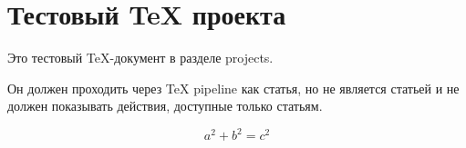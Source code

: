 \section{Тестовый TeX проекта}

Это тестовый TeX-документ в разделе projects.

Он должен проходить через TeX pipeline как статья, но не является статьей и не должен показывать действия, доступные только статьям.

\[
  a^2 + b^2 = c^2
\]

